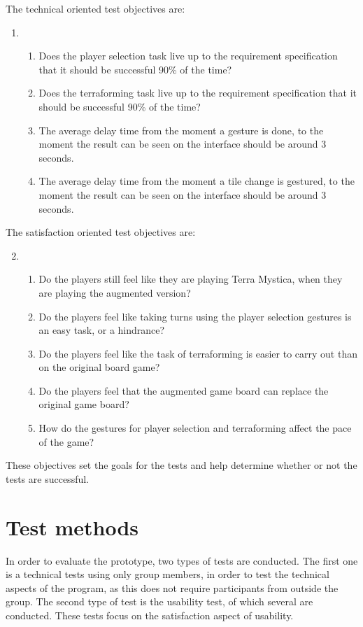 The technical oriented test objectives are:
\begin{enumerate}
\setcounter{enumi}{0}
\item \begin{enumerate}
\item Does the player selection task live up to the requirement specification that it should be successful 90\% of the time? \label{req:1A}
\item Does the terraforming task live up to the requirement specification that it should be successful 90\% of the time? \label{req:1B}
\item The average delay time from the moment a gesture is done, to the moment the result can be seen on the interface should be around 3 seconds. \label{req:1C}
\item The average delay time from the moment a tile change is gestured, to the moment the result can be seen on the interface should be around 3 seconds. \label{req:1D}
\end{enumerate}
\end{enumerate}
The satisfaction oriented test objectives are:
\begin{enumerate}
\setcounter{enumi}{1}
\item \begin{enumerate}
\item Do the players still feel like they are playing Terra Mystica, when they are playing the augmented version? \label{req:2A}
\item Do the players feel like taking turns using the player selection gestures is an easy task, or a hindrance? \label{req:2B}
\item Do the players feel like the task of terraforming is easier to carry out than on the original board game? \label{req:2C}
\item Do the players feel that the augmented game board can replace the original game board? \label{req:2D}
\item How do the gestures for player selection and terraforming affect the pace of the game? \label{req:2E}
\end{enumerate}
\end{enumerate}

These objectives set the goals for the tests and help determine whether or not the tests are successful. 

\section{Test methods}
In order to evaluate the prototype, two types  of tests are conducted. The first one is a technical tests using only group members, in order to test the technical aspects of the program, as this does not require participants from outside the group. The second type of test is the usability test, of which several are conducted. These tests focus on the satisfaction aspect of usability.

